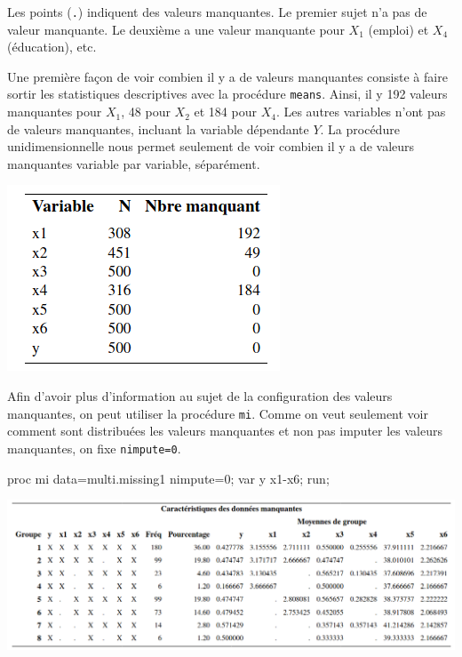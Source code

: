 \documentclass[
  11pt,
  letterpaper,
]{book}
\newenvironment{Shaded}{\begin{snugshade}}{\end{snugshade}}
\newcommand{\NormalTok}[1]{#1}
\theoremstyle{definition}
\theoremstyle{definition}
\theoremstyle{definition}
\theoremstyle{definition}
\theoremstyle{remark}
\begin{document}
Les points (\texttt{.}) indiquent des valeurs manquantes. Le premier sujet n'a pas de valeur manquante. Le deuxième a une valeur manquante pour \(X_1\) (emploi) et \(X_4\) (éducation), etc.

Une première façon de voir combien il y a de valeurs manquantes consiste à faire sortir les statistiques descriptives avec la procédure \texttt{means}.
Ainsi, il y 192 valeurs manquantes pour \(X_1\), 48 pour \(X_2\) et 184 pour \(X_4\). Les autres variables n'ont pas de valeurs manquantes, incluant la variable dépendante \(Y\). La procédure unidimensionnelle nous permet seulement de voir combien il y a de valeurs manquantes variable par variable, séparément.

\begin{center}\includegraphics[width=0.35\linewidth]{figures/06-manquantes-e1} \end{center}

Afin d'avoir plus d'information au sujet de la configuration des valeurs manquantes, on peut utiliser la procédure \texttt{mi}. Comme on veut seulement voir comment sont distribuées les valeurs manquantes et non pas imputer les valeurs manquantes, on fixe \texttt{nimpute=0}.

\begin{Shaded}
\begin{Highlighting}[]
\NormalTok{proc mi data=multi.missing1 nimpute=0;}
\NormalTok{var y x1{-}x6;}
\NormalTok{run;}
\end{Highlighting}
\end{Shaded}

\begin{center}\includegraphics[width=1\linewidth]{figures/06-manquantes-e2} \end{center}
\end{document}
